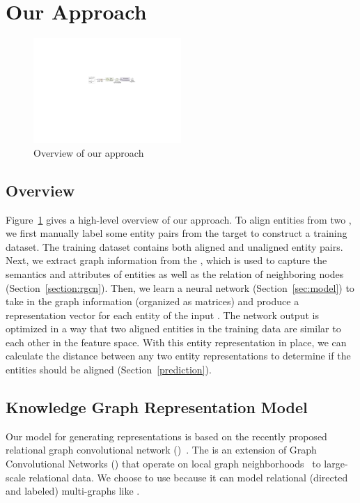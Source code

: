 \section{Our Approach}
	\label{section:app}
\begin{figure}
  \centering
  \includegraphics[width=0.5\textwidth]{figures/overview.pdf}
  \caption{Overview of our approach}\label{fig:overview}
  \vspace{-2mm}
\end{figure}

\subsection{Overview}
Figure~\ref{fig:overview} gives a high-level overview of our approach. To align entities from two \KGs, we first manually label some entity
pairs from the target \KGs to construct a training dataset. The training dataset contains both aligned and unaligned entity pairs. Next, we
extract graph information from the \KGs, which is used to capture the semantics and attributes of entities as well as the relation of
neighboring nodes (Section~\ref{section:rgcn}). Then, we learn a neural network (Section~\ref{sec:model}) to take in the graph information
(organized as matrices) and produce a representation vector for each entity of the input \KGs. The network output is optimized in a way
that two aligned entities in the training data are similar to each other in the feature space. With this entity representation in place, we
can calculate the distance between any two entity representations to determine if the entities should be aligned
(Section~\ref{prediction}).

	

	
    \subsection{Knowledge Graph Representation Model\label{sec:model}}
    Our model for generating \KG representations  is based on the recently proposed relational graph convolutional network (\RGCN)~\cite{Schlichtkrull2017Modeling}.
    The \RGCN is an extension of Graph Convolutional Networks (\GCNs) that operate on local graph neighborhoods~\cite{Duvenaud2015Convolutional,Kipf2016Semi} to large-scale relational data.
    We choose to use \RGCN because it can model relational (directed and labeled) multi-graphs like \KGs.

